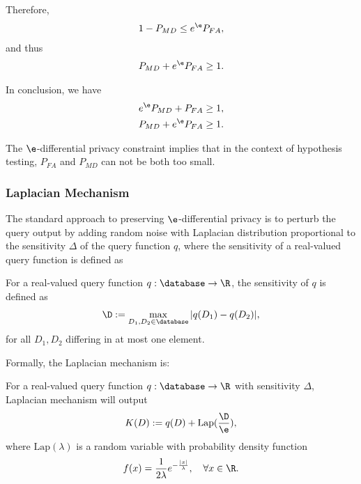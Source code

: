Therefore,
\begin{align}
	1 - P_{MD} \le e^{\e} P_{FA} ,
\end{align}
and thus
\begin{align}
	 P_{MD} + e^{\e} P_{FA} \ge 1 .
\end{align}

In conclusion,  we have
\begin{align}
  e^{\e} P_{MD} + P_{FA} &\ge 1 , \label{eq:famd1}\\
	P_{MD} + e^{\e} P_{FA} &\ge 1 \label{eq:famd2}.
\end{align}

The $\e$-differential privacy constraint implies that in the context of hypothesis testing,  $P_{FA}$ and $P_{MD}$ can not be both too small.











\subsubsection{Laplacian Mechanism}



The standard approach to preserving $\e$-differential privacy is to perturb the query output by adding random noise with Laplacian distribution proportional to the sensitivity $\Delta$ of the query function $q$, where the  sensitivity of a real-valued query function is defined as

\begin{definition}
	For a real-valued query function $q: \database \rightarrow \R$, the sensitivity of $q$ is defined as
	\begin{align}
	\D := \max_{D_1,D_2 \in \database} | q(D_1) - q(D_2)|, \label{def:sensitivity}
\end{align}
for all $D_1,D_2$ differing in at most one element.
\end{definition}


Formally, the  Laplacian mechanism is:
\begin{definition}
	For a real-valued query function $q: \database \rightarrow \R$ with sensitivity $\Delta$, Laplacian mechanism will output
	\begin{align}
		K(D) := q(D) + \text{Lap}(\frac{\D}{\e}),
	\end{align}
 	where $\text{Lap}(\lambda)$ is a random variable with probability density function
 	\begin{align}
 		f(x) = \frac{1}{2\lambda} e^{-\frac{|x|}{\lambda}}, \quad \forall x \in \R.
 	\end{align}
\end{definition}





